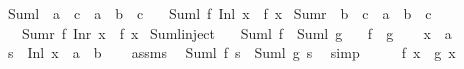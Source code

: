 \begin{isabellebody}
\isamarkupfalse%
\ Suml\ {\isacharcolon}{\kern0pt}{\isacharcolon}{\kern0pt}\ {\isachardoublequoteopen}{\isacharparenleft}{\kern0pt}{\isacharprime}{\kern0pt}a\ {\isasymRightarrow}\ {\isacharprime}{\kern0pt}c{\isacharparenright}{\kern0pt}\ {\isasymRightarrow}\ {\isacharprime}{\kern0pt}a\ {\isacharplus}{\kern0pt}\ {\isacharprime}{\kern0pt}b\ {\isasymRightarrow}\ {\isacharprime}{\kern0pt}c{\isachardoublequoteclose}\isanewline
\ \ \ {\isachardoublequoteopen}Suml\ f\ {\isacharparenleft}{\kern0pt}Inl\ x{\isacharparenright}{\kern0pt}\ {\isacharequal}{\kern0pt}\ f\ x{\isachardoublequoteclose}\isanewline
\isanewline
{}\isamarkupfalse%
\ Sumr\ {\isacharcolon}{\kern0pt}{\isacharcolon}{\kern0pt}\ {\isachardoublequoteopen}{\isacharparenleft}{\kern0pt}{\isacharprime}{\kern0pt}b\ {\isasymRightarrow}\ {\isacharprime}{\kern0pt}c{\isacharparenright}{\kern0pt}\ {\isasymRightarrow}\ {\isacharprime}{\kern0pt}a\ {\isacharplus}{\kern0pt}\ {\isacharprime}{\kern0pt}b\ {\isasymRightarrow}\ {\isacharprime}{\kern0pt}c{\isachardoublequoteclose}\isanewline
\ \ \ {\isachardoublequoteopen}Sumr\ f\ {\isacharparenleft}{\kern0pt}Inr\ x{\isacharparenright}{\kern0pt}\ {\isacharequal}{\kern0pt}\ f\ x{\isachardoublequoteclose}\isanewline
\isanewline
{}\isamarkupfalse%
\ Suml{\isacharunderscore}{\kern0pt}inject{\isacharcolon}{\kern0pt}\isanewline
\ \ \ {\isachardoublequoteopen}Suml\ f\ {\isacharequal}{\kern0pt}\ Suml\ g{\isachardoublequoteclose}\isanewline
\ \ \ {\isachardoublequoteopen}f\ {\isacharequal}{\kern0pt}\ g{\isachardoublequoteclose}\isanewline
%
\isadelimproof
%
\endisadelimproof
%
\isatagproof
{}\isamarkupfalse%
\isanewline
\ \ \isamarkupfalse%
\ x\ {\isacharcolon}{\kern0pt}{\isacharcolon}{\kern0pt}\ {\isacharprime}{\kern0pt}a\isanewline
\ \ \isamarkupfalse%
\ {\isacharquery}{\kern0pt}s\ {\isacharequal}{\kern0pt}\ {\isachardoublequoteopen}Inl\ x\ {\isacharcolon}{\kern0pt}{\isacharcolon}{\kern0pt}\ {\isacharprime}{\kern0pt}a\ {\isacharplus}{\kern0pt}\ {\isacharprime}{\kern0pt}b{\isachardoublequoteclose}\isanewline
\ \ \isamarkupfalse%
\ assms\ \isamarkupfalse%
\ {\isachardoublequoteopen}Suml\ f\ {\isacharquery}{\kern0pt}s\ {\isacharequal}{\kern0pt}\ Suml\ g\ {\isacharquery}{\kern0pt}s{\isachardoublequoteclose}\ \isamarkupfalse%
\ simp\isanewline
\ \ \isamarkupfalse%
\ \isamarkupfalse%
\ {\isachardoublequoteopen}f\ x\ {\isacharequal}{\kern0pt}\ g\ x{\isachardoublequoteclose}\ \isamarkupfalse%

\end{isabellebody}
